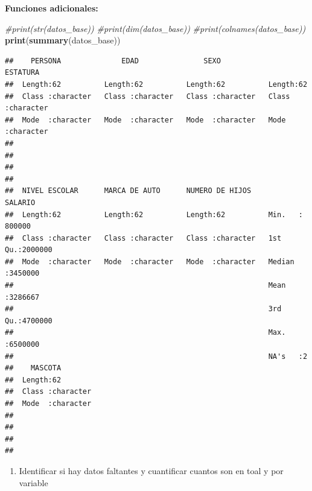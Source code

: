 \documentclass[
]{article}
\newenvironment{Shaded}{\begin{snugshade}}{\end{snugshade}}
\newcommand{\CommentTok}[1]{\textcolor[rgb]{0.56,0.35,0.01}{\textit{#1}}}
\newcommand{\FunctionTok}[1]{\textcolor[rgb]{0.13,0.29,0.53}{\textbf{#1}}}
\newcommand{\NormalTok}[1]{#1}
\providecommand{\tightlist}{%
  \setlength{\itemsep}{0pt}\setlength{\parskip}{0pt}}
\begin{document}
\textbf{Funciones adicionales:}

\begin{Shaded}
\begin{Highlighting}[]
\CommentTok{\#print(str(datos\_base))}
\CommentTok{\#print(dim(datos\_base))}
\CommentTok{\#print(colnames(datos\_base))}
\FunctionTok{print}\NormalTok{(}\FunctionTok{summary}\NormalTok{(datos\_base))}
\end{Highlighting}
\end{Shaded}

\begin{verbatim}
##    PERSONA              EDAD               SEXO             ESTATURA        
##  Length:62          Length:62          Length:62          Length:62         
##  Class :character   Class :character   Class :character   Class :character  
##  Mode  :character   Mode  :character   Mode  :character   Mode  :character  
##                                                                             
##                                                                             
##                                                                             
##                                                                             
##  NIVEL ESCOLAR      MARCA DE AUTO      NUMERO DE HIJOS       SALARIO       
##  Length:62          Length:62          Length:62          Min.   : 800000  
##  Class :character   Class :character   Class :character   1st Qu.:2000000  
##  Mode  :character   Mode  :character   Mode  :character   Median :3450000  
##                                                           Mean   :3286667  
##                                                           3rd Qu.:4700000  
##                                                           Max.   :6500000  
##                                                           NA's   :2        
##    MASCOTA         
##  Length:62         
##  Class :character  
##  Mode  :character  
##                    
##                    
##                    
## 
\end{verbatim}

\begin{enumerate}
\def\labelenumi{\alph{enumi}.}
\setcounter{enumi}{4}
\tightlist
\item
  Identificar si hay datos faltantes y cuantificar cuantos son en toal y
  por variable
\end{enumerate}
\end{document}
